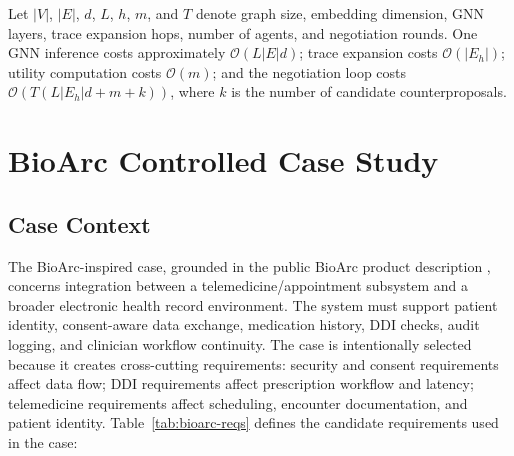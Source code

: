 \documentclass[english,preprint,nonatbib]{elsarticle}
\begin{document}
Let $\lvert V\rvert$, $\lvert E\rvert$, $d$, $L$, $h$, $m$, and $T$
denote graph size, embedding dimension, GNN layers, trace expansion hops,
number of agents, and negotiation rounds. One GNN inference costs approximately
$\mathcal{O}(L\lvert E\rvert d)$; trace expansion costs
$\mathcal{O}(\lvert E_h\rvert)$; utility computation costs $\mathcal{O}(m)$;
and the negotiation loop costs
$\mathcal{O}\!\left(T(L\lvert E_h\rvert d + m + k)\right)$, where $k$ is
the number of candidate counterproposals.


\section{BioArc Controlled Case Study}
\label{sec:bioarc-case}

\subsection{Case Context}

The BioArc-inspired case, grounded in the public BioArc product description \cite{bioarc2024}, concerns integration between a telemedicine/appointment subsystem and a broader electronic health record environment.
The system must support patient identity, consent-aware data exchange, medication history, DDI checks, audit logging, and clinician workflow continuity.
The case is intentionally selected because it creates cross-cutting requirements: security and consent requirements affect data flow;
DDI requirements affect prescription workflow and latency; telemedicine requirements affect scheduling, encounter documentation, and patient identity.
Table~\ref{tab:bioarc-reqs} defines the candidate requirements used in the case:
\end{document}
